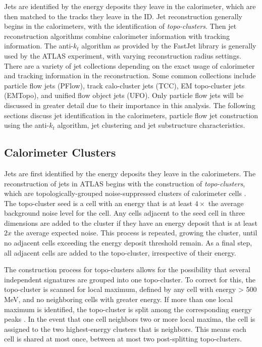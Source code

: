 Jets are identified by the energy deposits they leave in the calorimeter, which are then matched to the tracks they leave in the ID. Jet reconstruction generally begins in the calorimeters, with the identification of \textit{topo-clusters}. Then jet reconstruction algorithms combine calorimeter information with tracking information. The anti-$k_t$ algorithm \cite{anti_kt} as provided by the FastJet library \cite{fast_jet} is generally used by the ATLAS experiment, with varying reconstruction radius settings. There are a variety of jet collections depending on the exact usage of calorimeter and tracking information in the reconstruction. Some common collections include particle flow jets (PFlow), track calo-cluster jets (TCC), EM topo-cluster jets (EMTopo), and unified flow object jets (UFO). Only particle flow jets will be discussed in greater detail due to their importance in this analysis. The following sections discuss jet identification in the calorimeters, particle flow jet construction using the anti-$k_t$ algorithm, jet clustering and jet substructure characteristics.

\subsection{Calorimeter Clusters}
Jets are first identified by the energy deposits they leave in the calorimeters. The reconstruction of jets in ATLAS begins with the construction of \textit{topo-clusters}, which are topologically-grouped noise-suppressed clusters of calorimeter cells \cite{jet_reco}. The topo-cluster seed is a cell with an energy that is at least $4\times$ the average background noise level for the cell. Any cells adjacent to the seed cell in three dimensions are added to the cluster if they have an energy deposit that is at least $2x$ the average expected noise. This process is repeated, growing the cluster, until no adjacent cells exceeding the energy deposit threshold remain. As a final step, all adjacent cells are added to the topo-cluster, irrespective of their energy. \par

The construction process for topo-clusters allows for the possibility that several independent signatures are grouped into one topo-cluster. To correct for this, the topo-cluster is scanned for local maximum, defined by any cell with energy > 500 MeV, and no neighboring cells with greater energy. If more than one local maximum is identified, the topo-cluster is split among the corresponding energy peaks \cite{topo_clusters}. In the event that one cell neighbors two or more local maxima, the cell is assigned to the two highest-energy clusters that is neighbors. This means each cell is shared at most once, between at most two post-splitting topo-clusters.\par

